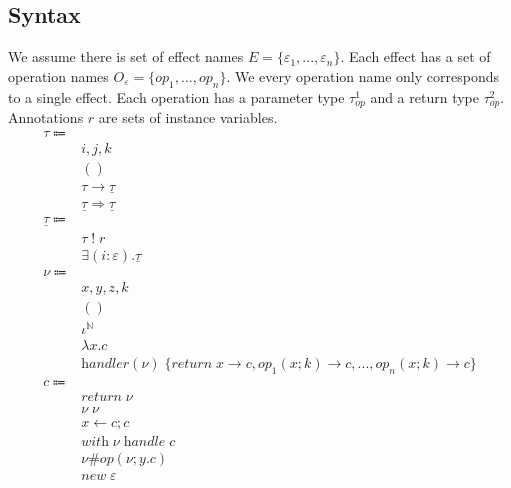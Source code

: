 \documentclass[12pt]{article}
\newcommand\Eff[0]{E}
\newcommand\eff[0]{\varepsilon}
\newcommand\Op[0]{O}
\newcommand\op[0]{op}
\newcommand\pty[1]{\ty^1_{#1}}
\newcommand\rty[1]{\ty^2_{#1}}
\newcommand\ty[0]{\tau}
\newcommand\tunit[0]{()}
\newcommand\tarr[2]{#1 \rightarrow #2}
\newcommand\thandler[2]{#1 \Rightarrow #2}
\newcommand\cty[0]{\underline{\ty}}
\newcommand\aty[2]{#1 \; ! \; #2}
\newcommand\texists[3]{\exists(#1:#2) . #3}
\newcommand\val[0]{\nu}
\newcommand\vunit[0]{()}
\newcommand\vabs[2]{\lambda #1 . #2}
\newcommand\vhandleri[2]{\textit{handler} ( #1 ) \; \{#2\}}
\newcommand\vhandlerci[1]{\vhandleri{#1}{
	\textit{return} \; x \rightarrow \comp,
	\op_1(x ; k) \rightarrow \comp,
	...,
	\op_n(x ; k) \rightarrow \comp
}}
\newcommand\comp[0]{c}
\newcommand\creturn[1]{\textit{return} \; #1}
\newcommand\capp[2]{#1 \; #2}
\newcommand\cdo[3]{#1 \leftarrow #2 ; #3}
\newcommand\copi[5]{#1 \# #2(#3 ; #4 . #5)}
\newcommand\chandle[2]{\textit{with} \; #1 \; \textit{handle} \; #2}
\newcommand\cnew[1]{\textit{new} \; #1}
\begin{document}
\subsection{Syntax}
We assume there is set of effect names $\Eff = \{ \eff_1, ..., \eff_n \}$.
Each effect has a set of operation names $\Op_\eff = \{ \op_1, ..., \op_n \}$.
We every operation name only corresponds to a single effect.
Each operation has a parameter type $\pty{\op}$ and a return type $\rty{\op}$.
Annotations $r$ are sets of instance variables.
\\
\begin{align*}
	\ty \Coloneqq 				& 											\tag{value types} \\
									& i, j, k									\tag{instance variables} \\
									& \tunit									\tag{unit type} \\
									& \tarr{\ty}{\cty}						\tag{type of functions} \\
									& \thandler{\cty}{\cty}				\tag{type of handlers} \\
	\cty \Coloneqq 			& 											\tag{computation types} \\
									& \aty{\ty}{r}							\tag{annotated type} \\
									& \texists{i}{\eff}{\cty}				\tag{existential} \\
	\val \Coloneqq			&											\tag{values} \\
									& x, y, z, k								\tag{variables} \\
									& \vunit									\tag{unit value} \\
									& \iota^\mathbb{N}						\tag{instances} \\
									& \vabs{x}{\comp}					\tag{abstraction} \\
									& \vhandlerci{\val}						\tag{handler} \\
	\comp \Coloneqq		&											\tag{computations} \\
									& \creturn{\val}						\tag{return value as computation} \\
									& \capp{\val}{\val}					\tag{application} \\
									& \cdo{x}{\comp}{\comp}			\tag{sequencing} \\
									& \chandle{\val}{\comp}			\tag{handler application} \\
									& \copi{\val}{\op}{\val}{y}{\comp}	\tag{operation call} \\
									& \cnew{\eff}							\tag{instance creation} \\
\end{align*}
\end{document}
